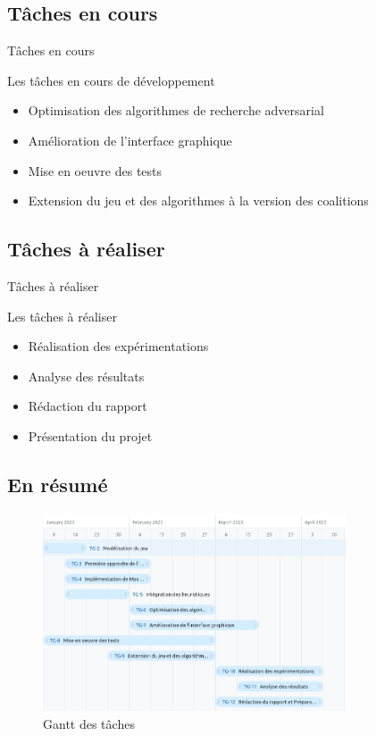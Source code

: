 \documentclass{beamer}
\begin{document}
    \subsection*{Tâches en cours}
    \begin{frame}{Tâches en cours}
        \begin{block}{Les tâches en cours de développement}
            \begin{itemize}
                \item Optimisation des algorithmes de recherche adversarial
                \item Amélioration de l'interface graphique
                \item Mise en oeuvre des tests
                \item Extension du jeu et des algorithmes à la version des coalitions
            \end{itemize}
        \end{block}
    \end{frame}
    \subsection*{Tâches à réaliser}
    \begin{frame}{Tâches à réaliser}
        \begin{block}{Les tâches à réaliser}
            \begin{itemize}
                \item Réalisation des expérimentations
                \item Analyse des résultats
                \item Rédaction du rapport
                \item Présentation du projet
            \end{itemize}
        \end{block}
    \end{frame}
    \subsection*{En résumé}
    \begin{frame}
        \begin{center}
            \begin{figure}
                \includegraphics[width=0.8\textwidth]{Images/gant}
                \caption{Gantt des tâches}
            \end{figure}
        \end{center}
    \end{frame}
\end{document}
